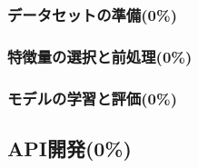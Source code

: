       \subsubsection{データセットの準備(0\%)}
        \label{sec:データセットの準備}
          \par
          
      \subsubsection{特徴量の選択と前処理(0\%)}
        \label{sec:特徴量の選択と前処理}
          \par
          
      \subsubsection{モデルの学習と評価(0\%)}
        \label{sec:モデルの学習と評価}
          \par
          
  \subsection{API開発(0\%)}
    \label{sec:API開発}
      \par
      
